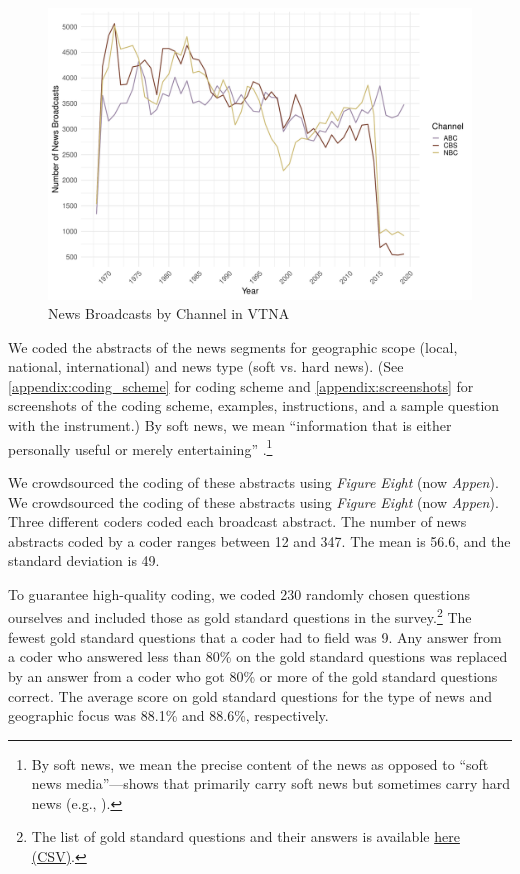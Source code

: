\documentclass[12pt, letterpaper]{article}
\begin{document}
\begin{figure}[H]
  \centering
  \caption{News Broadcasts by Channel in VTNA}
  \label{fig:vandy_channel}
  \includegraphics[width=.95\linewidth]{../figs/fig_channel_total.pdf}
\end{figure}

We coded the abstracts of the news segments for geographic scope (local, national, international) and news type (soft vs. hard news). (See \ref{appendix:coding_scheme} for coding scheme and \ref{appendix:screenshots} for screenshots of the coding scheme, examples, instructions, and a sample question with the instrument.) By soft news, we mean ``information that is either personally useful or merely entertaining'' \citep{zaller2003new}.\footnote{By soft news, we mean the precise content of the news as opposed to ``soft news media''---shows that primarily carry soft news but sometimes carry hard news (e.g., \cite{baum2006oprah}).}

We crowdsourced the coding of these abstracts using \textit{Figure Eight} (now \textit{Appen}). We crowdsourced the coding of these abstracts using \textit{Figure Eight} (now \textit{Appen}). Three different coders coded each broadcast abstract. The number of news abstracts coded by a coder ranges between 12 and 347. The mean is 56.6, and the standard deviation is 49. 

To guarantee high-quality coding, we coded 230 randomly chosen questions ourselves and included those as gold standard questions in the survey.\footnote{The list of gold standard questions and their answers is available \href{https://github.com/notnews/notwork_news/blob/master/data/sample_questions_gold.csv}{here (CSV)}.} The fewest gold standard questions that a coder had to field was 9. Any answer from a coder who answered less than 80\% on the gold standard questions was replaced by an answer from a coder who got 80\% or more of the gold standard questions correct. The average score on gold standard questions for the type of news and geographic focus was 88.1\% and 88.6\%, respectively. 
\end{document}
